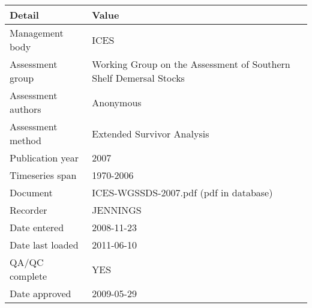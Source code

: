 \begin{table}[htb]
\centering
\begin{tabular}{lp{7cm}}
\toprule
Detail & Value \\
\midrule
Management body    & ICES                                                              \\
Assessment group   & Working Group on the Assessment of Southern Shelf Demersal Stocks \\
Assessment authors & Anonymous                                                         \\
Assessment method  & Extended Survivor Analysis                                        \\
Publication year   & 2007                                                              \\
Timeseries span    & 1970-2006                                                         \\
Document           & ICES-WGSSDS-2007.pdf (pdf in database)                            \\
Recorder           & JENNINGS                                                          \\
Date entered       & 2008-11-23                                                        \\
Date last loaded   & 2011-06-10                                                        \\
QA/QC complete     & YES                                                               \\
Date approved      & 2009-05-29                                                        \\
\bottomrule
\end{tabular}
\label{tab:assessdet}
\end{table}
